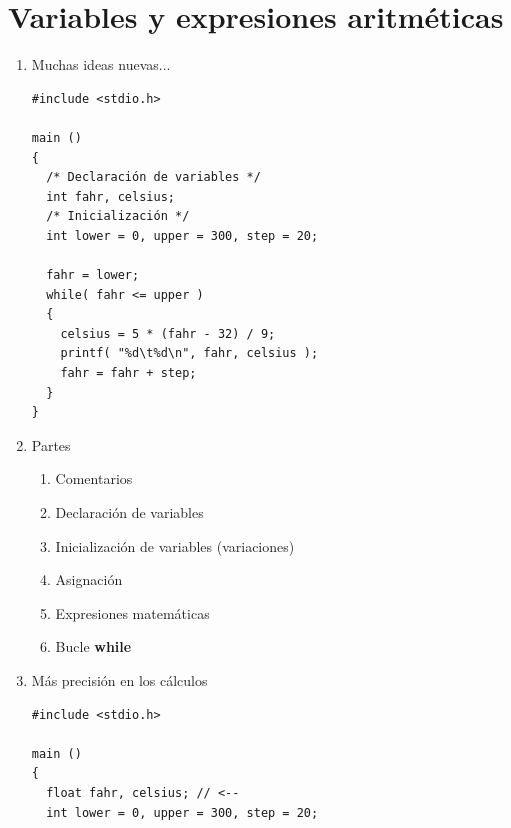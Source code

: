 \documentclass[a4paper,oneside]{article}
\begin{document}
\section{Variables y expresiones aritméticas}
  \begin{enumerate}
  \item Muchas ideas nuevas...

    \begin{verbatim}
#include <stdio.h>

main ()
{
  /* Declaración de variables */
  int fahr, celsius;
  /* Inicialización */
  int lower = 0, upper = 300, step = 20;

  fahr = lower;
  while( fahr <= upper )
  {
    celsius = 5 * (fahr - 32) / 9;
    printf( "%d\t%d\n", fahr, celsius );
    fahr = fahr + step;
  }
}
    \end{verbatim}
  \item Partes
    \begin{enumerate}
      \item Comentarios
      \item Declaración de variables
      \item Inicialización de variables (variaciones)
      \item Asignación
      \item Expresiones matemáticas
      \item Bucle \textbf{while}
    \end{enumerate}
  \item Más precisión en los cálculos

    \begin{verbatim}
#include <stdio.h>

main ()
{
  float fahr, celsius; // <--
  int lower = 0, upper = 300, step = 20;


\end{verbatim}
\end{enumerate}
\end{document}
